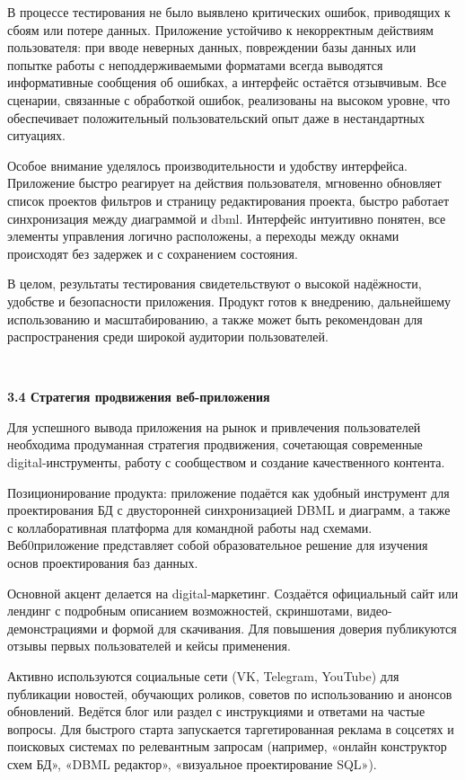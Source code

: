 В процессе тестирования не было выявлено критических ошибок,
приводящих к сбоям или потере данных. Приложение устойчиво к
некорректным действиям пользователя: при вводе неверных данных, повреждении базы данных или попытке работы с
неподдерживаемыми форматами всегда выводятся информативные
сообщения об ошибках, а интерфейс остаётся отзывчивым. Все сценарии,
связанные с обработкой ошибок, реализованы на высоком уровне, что
обеспечивает положительный пользовательский опыт даже в нестандартных
ситуациях.

Особое внимание уделялось производительности и удобству
интерфейса. Приложение быстро реагирует на действия пользователя,
мгновенно обновляет список проектов фильтров и страницу редактирования проекта, быстро работает синхронизация между диаграммой и dbml.
Интерфейс интуитивно понятен, все элементы управления логично
расположены, а переходы между окнами происходят без задержек и с
сохранением состояния.

В целом, результаты тестирования свидетельствуют о высокой
надёжности, удобстве и безопасности приложения. Продукт готов к
внедрению, дальнейшему использованию и масштабированию, а также может
быть рекомендован для распространения среди широкой аудитории
пользователей.

\

\textbf{\large 3.4  Стратегия продвижения веб-приложения}

Для успешного вывода приложения на рынок и привлечения
пользователей необходима продуманная стратегия продвижения, сочетающая
современные digital-инструменты, работу с сообществом и создание
качественного контента.

Позиционирование продукта: приложение подаётся как
удобный инструмент для проектирования БД с двусторонней синхронизацией DBML и диаграмм, а также с коллаборативная платформа для командной работы над схемами. Веб0приложение представляет собой образовательное решение для изучения основ проектирования баз данных.

Основной акцент делается на digital-маркетинг. Создаётся официальный
сайт или лендинг с подробным описанием возможностей, скриншотами,
видео-демонстрациями и формой для скачивания. Для повышения доверия
публикуются отзывы первых пользователей и кейсы применения.

Активно используются социальные сети (VK, Telegram, YouTube) для публикации новостей, обучающих
роликов, советов по использованию и анонсов обновлений. Ведётся блог или
раздел с инструкциями и ответами на частые вопросы. Для быстрого старта
запускается таргетированная реклама в соцсетях и поисковых системах по
релевантным запросам (например, «онлайн конструктор схем БД», «DBML редактор», «визуальное проектирование SQL»).

